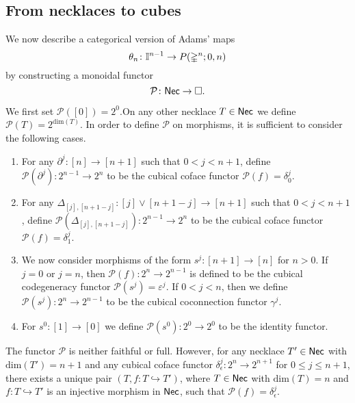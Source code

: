 \subsection{From necklaces to cubes}

We now describe a categorical version of Adams' maps
\begin{equation*}
\theta_n \colon \mathbb{I}^{n-1} \to P(\mathbb{\Delta}^{n};0,n)
\end{equation*}
by constructing a monoidal functor
\begin{equation*}
\mathcal{P} \colon \mathsf{Nec} \to \square.
\end{equation*}

We first set $\mathcal{P}([0])=2^0$.On any other necklace $T \in \mathsf{Nec}$ we define $\mathcal{P}( T )= 2^{\text{dim}(T)}$.
In order to define $\mathcal{P}$ on morphisms, it is sufficient to consider the following cases.
\begin{enumerate}
	\item For any $\partial^j \colon [n] \to [n+1]$ such that $0< j<{n+1}$, define $\mathcal{P}(\partial^j) \colon 2^{n-1}\to 2^{n}$ to be the cubical coface functor $\mathcal{P}(f)= \delta_0^{j}.$ 
	
	\item For any $\Delta_{[j], [n+1-j]} \colon [j] \vee [n+1-j] \to [n+1]$ such that $0<j<n+1$, define $\mathcal{P}(\Delta_{[j], [n+1-j]}) \colon 2^{n-1}\to 2^{n}$ to be the cubical coface functor $\mathcal{P}(f)=\delta_1^{j}$.
	
	\item We now consider morphisms of the form $s^j \colon [n+1] \to [n]$ for $n>0$.
	If $j=0$ or $j=n$, then $\mathcal{P}(f) \colon 2^n \to 2^{n-1}$ is defined to be the cubical codegeneracy functor $\mathcal{P}(s^j)= \varepsilon^{j}.$ If $0<j<n$, then we define $\mathcal{P}(s^j) \colon 2^n \to 2^{n-1}$ to be the cubical coconnection functor $\gamma^{j}.$
	
	\item For $s^0 \colon [1] \to [0]$ we define $\mathcal{P}(s^0) \colon 2^0 \to 2^0$ to be the identity functor.
\end{enumerate}

\begin{remark}
	The functor $\mathcal{P}$ is neither faithful or full.
	However, for any necklace $T' \in \mathsf{Nec}$ with $\text{dim}(T')=n+1$ and any cubical coface functor $\delta_{\epsilon}^j \colon 2^n \to 2^{n+1}$ for $0 \leq j \leq n+1$, there exists a unique pair $(T, f \colon T \hookrightarrow T')$, where $T \in \mathsf{Nec}$ with $\text{dim}(T)=n$ and $f \colon T \hookrightarrow T'$ is an injective morphism in $\mathsf{Nec}$, such that $\mathcal{P}(f) = \delta_{\epsilon}^j $.
\end{remark}

